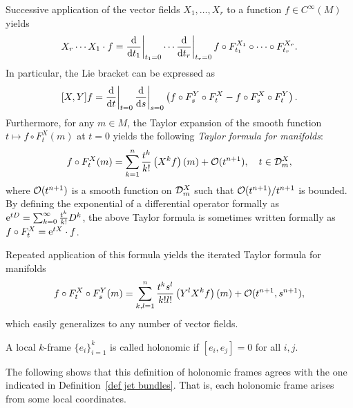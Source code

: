 \begin{rem}\label{rem 3.2.9 RS1}
    Successive application of the vector fields $X_1,\ldots,X_r$ to a function $f\in C^\infty(M)$ yields
    \[X_r\cdots X_1 \cdot f=\restr{\frac{\dd}{\dd t_1}}{t_1=0}\cdots \restr{\frac{\dd}{\dd t_r}}{t_r=0}f\circ F^{X_1}_{t_1}\circ \cdots \circ F^{X_r}_{t_r}.\]
    In particular, the Lie bracket can be expressed as
    \[[X,Y]f=\restr{\frac{\dd}{\dd t}}{t=0}\restr{\frac{\dd}{\dd s}}{s=0}\left(f\circ F^Y_s\circ F^X_t-f\circ F^X_s\circ F^Y_t\right).\label{eq Lie bracket in terms of flows}\]
    Furthermore, for any $m\in M$, the Taylor expansion of the smooth function $t\mapsto f\circ F^X_t(m)$ at $t=0$ yields the following \emph{Taylor formula for manifolds}:
    \[f\circ F^X_t(m)=\sum_{k=1}^n\frac{t^k}{k!}\left(X^kf\right)(m)+\mathcal{O}(t^{n+1}), \quad t\in \mathcal{D}^X_m,\label{eq:Taylor formula for manifolds}\]
    where $\mathcal{O}(t^{n+1})$ is a smooth function on $\mathcal{D}_m^X$ such that $\mathcal{O}(t^{n+1})/t^{n+1}$ is bounded. By defining the exponential of a differential operator formally as $\mathrm{e}^{tD}=\sum_{k=0}^\infty \frac{t^k}{k!}D^k$, the above Taylor formula is sometimes written formally as $f\circ F^X_t=\mathrm{e}^{t X}\cdot f$.

    Repeated application of this formula yields the iterated Taylor formula for manifolds
    \[f\circ F^X_t\circ F^Y_s(m)=\sum_{k,l=1}^n\frac{t^ks^l}{k!l!}\left(Y^lX^kf\right)(m)+\mathcal{O}(t^{n+1},s^{n+1}),\label{eq: Taylor formula for two fields}\]
    which easily generalizes to any number of vector fields.
\end{rem}


\begin{defn}
    A local $k$-frame $\{e_i\}_{i=1}^k$ is called holonomic if $[e_i,e_j]=0$ for all $i,j$.
\end{defn}

The following shows that this definition of holonomic frames agrees with the one indicated in Definition~\ref{def jet bundles}. That is, each holonomic frame arises from some local coordinates.

